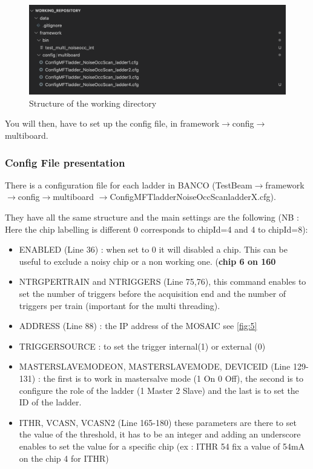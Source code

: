 \documentclass[12pt,oneside,a4]{article}
\begin{document}
\begin{figure}[h]
        \centering
        \includegraphics[scale =0.3]{figures/Repository.png}
        \caption{Structure of the working directory}
        \label{fig:9}
\end{figure}

You will then, have to set up the config file, in framework$\rightarrow$config$\rightarrow$multiboard.

 \subsubsection{Config File presentation}\label{Config File presentation}
There is a configuration file for each ladder in BANCO (Test\textunderscore Beam$\rightarrow$framework$\rightarrow$config$\rightarrow$multiboard
$\rightarrow$ConfigMFTladder\textunderscore NoiseOccScan\textunderscore ladderX.cfg). 

\bigskip

They have all the same structure and the main settings are the following (NB : Here the chip labelling is different 0 corresponds to chipId=4 and 4 to chipId=8):
\begin{itemize}
    \item ENABLED  (Line 36) : when set to 0 it will disabled a chip. This can be useful to exclude a noisy chip or a non working one. (\textbf{chip 6 on 160}
    \item NTRGPERTRAIN and NTRIGGERS (Line 75,76), this command enables to set the number of triggers before the acquisition end and the number of triggers per train (important for the multi threading).
    \item ADDRESS (Line 88) : the IP address of the MOSAIC see \ref{fig:5}
    \item TRIGGERSOURCE : to set the trigger internal(1) or external (0)
    \item MASTERSLAVEMODEON, MASTERSLAVEMODE, DEVICEID (Line 129-131) : the first is to work in mastersalve mode (1 On 0 Off), the second is to configure the role of the ladder (1 Master 2 Slave) and the last is to set the ID of the ladder.
    \item ITHR, VCASN, VCASN2 (Line 165-180) these parameters are there to set the value of the threshold, it has to be an integer and adding an underscore enables to set the value for a specific chip (ex : ITHR 54 fix a value of 54mA on the chip 4 for ITHR)  
\end{itemize}
\end{document}
